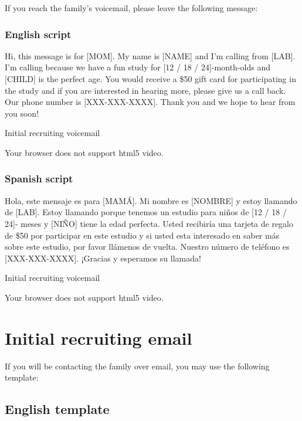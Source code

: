 \documentclass[
]{book}
\begin{document}
If you reach the family's voicemail, please leave the following message:

\hypertarget{english-script}{%
\subsubsection*{English script}\label{english-script}}

Hi, this message is for {[}MOM{]}. My name is {[}NAME{]} and I'm calling from {[}LAB{]}. I'm calling because we have a fun study for {[}12 / 18 / 24{]}-month-olds and {[}CHILD{]} is the perfect age. You would receive a \$50 gift card for participating in the study and if you are interested in hearing more, please give us a call back. Our phone number is {[}XXX-XXX-XXXX{]}. Thank you and we hope to hear from you soon!

Initial recruiting voicemail

Your browser does not support html5 video.

\hypertarget{spanish-script}{%
\subsubsection*{Spanish script}\label{spanish-script}}

Hola, este mensaje es para {[}MAMÁ{]}. Mi nombre es {[}NOMBRE{]} y estoy llamando de {[}LAB{]}. Estoy llamando porque tenemos un estudio para niños de {[}12 / 18 / 24{]}- meses y {[}NIÑO{]} tiene la edad perfecta. Usted recibiría una tarjeta de regalo de \$50 por participar en este estudio y si usted esta interesado en saber más sobre este estudio, por favor llámenos de vuelta. Nuestro número de teléfono es {[}XXX-XXX-XXXX{]}. ¡Gracias y esperamos su llamada!

Initial recruiting voicemail

Your browser does not support html5 video.

\hypertarget{initial-recruiting-email}{%
\section{Initial recruiting email}\label{initial-recruiting-email}}

If you will be contacting the family over email, you may use the following template:

\hypertarget{english-template}{%
\subsection*{English template}\label{english-template}}
\end{document}
